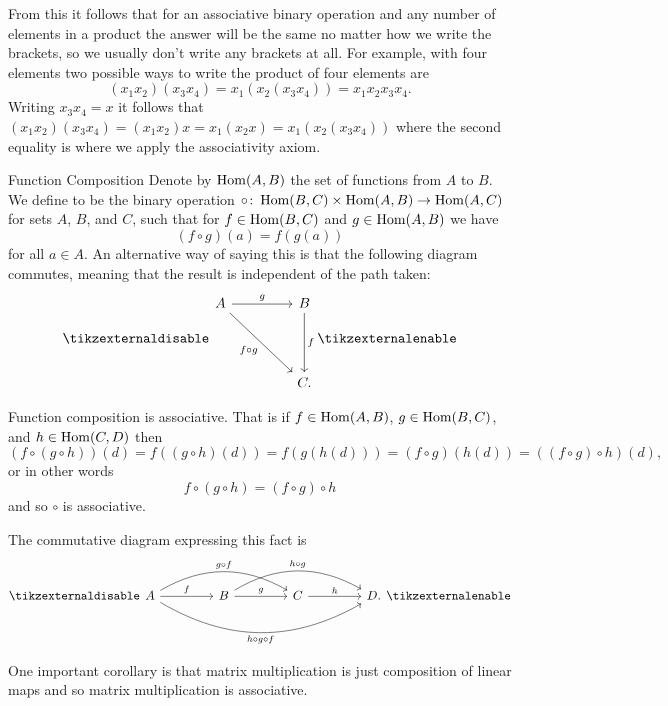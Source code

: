 From this it follows that for an associative binary operation and any number of elements in a product the answer will be the same no matter how we write the brackets, so we usually don't write any brackets at all.
For example, with four elements two possible ways to write the product of four elements are
\begin{equation}
    (x_1 x_2) (x_3 x_4) = x_1(x_2(x_3x_4)) = x_1 x_2 x_3 x_4.
\end{equation}
Writing \(x_3x_4 = x\) it follows that \((x_1x_2)(x_3x_4) = (x_1x_2)x = x_1(x_2x) = x_1(x_2(x_3x_4))\) where the second equality is where we apply the associativity axiom.

\begin{exm}{Function Composition}{}
    Denote by \(\operatorname{Hom}(A, B)\) the set of functions from \(A\) to \(B\).
    We define  to be the binary operation \(\circ\colon \operatorname{Hom}(B, C) \times \operatorname{Hom}(A, B) \to \operatorname{Hom}(A, C)\) for sets \(A\), \(B\), and \(C\), such that for \(f \in \operatorname{Hom}(B, C)\) and \(g \in \operatorname{Hom}(A, B)\) we have
    \begin{equation}
        (f \circ g)(a) = f(g(a))
    \end{equation}
    for all \(a \in A\).
    An alternative way of saying this is that the following diagram commutes, meaning that the result is independent of the path taken:
    \begin{equation}
        \tikzexternaldisable
        \begin{tikzcd}[row sep=1.5cm, column sep=1.5cm]
            A \ar[r, "g"] \ar[dr, "f \circ g", swap] & B \ar[d, "f"] \\
            & C.
        \end{tikzcd}
        \tikzexternalenable
    \end{equation}
    
    Function composition is associative.
    That is if \(f \in \operatorname{Hom}(A, B)\), \(g \in \operatorname{Hom}(B, C)\), and \(h \in \operatorname{Hom}(C, D)\) then
    \begin{equation*}
        (f \circ (g \circ h))(d) = f((g\circ h)(d)) = f(g(h(d))) = (f\circ g)(h(d)) = ((f\circ g)\circ h)(d),
    \end{equation*}
    or in other words
    \begin{equation}
        f \circ (g \circ h) = (f \circ g) \circ h
    \end{equation}
    and so \(\circ\) is associative.
    
    The commutative diagram expressing this fact is
    \begin{equation}
        \tikzexternaldisable
        \begin{tikzcd}[column sep=1.5cm]
            A \ar[r, "f"] \ar[rr, "g \circ f", bend left] \ar[rrr, "h \circ g \circ f", bend right, swap] & B \ar[r, "g"] \ar[rr, "h \circ g", bend left] & C \ar[r, "h"] & D.
        \end{tikzcd}
        \tikzexternalenable
    \end{equation}
    
    One important corollary is that matrix multiplication is just composition of linear maps and so matrix multiplication is associative.
\end{exm}

